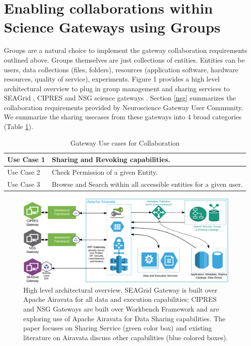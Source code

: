 \documentclass[sigconf]{acmart}
\begin{document}
\section{Enabling collaborations within Science Gateways using Groups}

Groups are a natural choice to implement the gateway collaboration requirements outlined above. Groups themselves are just collections of entities. Entities can be  users, data collections (files, folders), resources (application software, hardware resources, quality of service), experiments. Figure 1 provides a high level architectural overview to plug in group management and sharing services to SEAGrid \cite{seagridCommunity2016}, CIPRES \cite{cipres2010} and NSG science gateways \cite{nsg2013}. Section \ref{nsg} summarizes the collaboration requirements provided by Neuroscience Gateway User Community. We summarize the sharing usecases from these gateways into 4 broad categories (Table \ref{table:usecases}). 

\begin{table}
\begin{tabular}{ |p{2cm}|p{6cm}| }
\hline
Use Case 1 & Sharing and Revoking capabilities.\\
\hline
Use Case 2 & Check Permission of a given Entity.\\
\hline
Use Case 3 & Browse and Search within all accessible entities for a given user.\\
\hline
\end{tabular}
\caption{Gateway Use cases for Collaboration}
\label{table:usecases}
\end{table}

\begin{figure}
\includegraphics[width=5.5in]{figures/gateway-integaration-overview.pdf}
\caption{High level architectural overview. SEAGrid Gateway is built over Apache Airavata for all data and execution capabilities; CIPRES and NSG Gateways are built over Workbench Framework and are exploring use of Apache Airavata for Data Sharing capabilities. The paper focuses on Sharing Service (green color box) and existing literature on Airavata discuss other capabilities (blue colored boxes).}
\end{figure}
\end{document}
